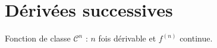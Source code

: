 \section{Dérivées successives}\label{sec:deriv-es-successives}

    Fonction de classe $\mathcal{C}^n$ : $n$ fois dérivable et $f^{(n)}$ continue.\\

